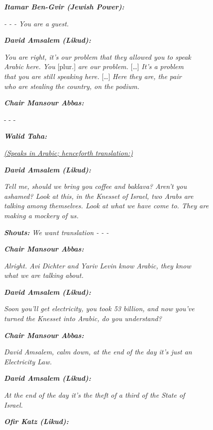 \documentclass[output=paper,arabicfont]{langscibook}
\begin{document}
\begin{exe}
\begin{linenumbers*}
\textit{\textbf{Itamar Ben-Gvir (Jewish Power):}}

\textit{- - - You are a guest.}

\textit{\textbf{David Amsalem (Likud):}}

\textit{You are right, it’s our problem that they allowed you to speak\\
Arabic here. You} [plur.] \textit{are our problem.} […] \textit{It’s a problem\\
that you are still speaking here.} […] \textit{Here they are, the pair\\
who are stealing the country, on the podium.}
 
\textit{\textbf{Chair Mansour Abbas:}}

- - -

\textbf{\textit{Walid Taha:}}

\textit{\ul{(Speaks in Arabic; henceforth translation:)}}

\textit{\textbf{David Amsalem (Likud):}}

\textit{Tell me, should we bring you coffee and baklava? Aren’t you\\
ashamed? Look at this, in the Knesset of Israel, two Arabs are\\
talking among themselves. Look at what we have come to. They are\\
making a mockery of us.}

\textit{\textbf{Shouts:} We want translation - - -}

\textit{\textbf{Chair Mansour Abbas:}}

\textit{Alright. Avi Dichter and Yariv Levin know Arabic, they know\\
what we are talking about.}

\textit{\textbf{David Amsalem (Likud):}}

\textit{Soon you’ll get electricity, you took 53 billion, and now you’ve\\
turned the Knesset into Arabic, do you understand?}

\textit{\textbf{Chair Mansour Abbas:}}

\textit{David Amsalem, calm down, at the end of the day it’s just an\\
Electricity Law.}

\textit{\textbf{David Amsalem (Likud):}}

\textit{At the end of the day it’s the theft of a third of the State of\\
Israel.}

\textit{\textbf{Ofir Katz (Likud):}}


\end{linenumbers*}
\end{exe}
\end{document}
